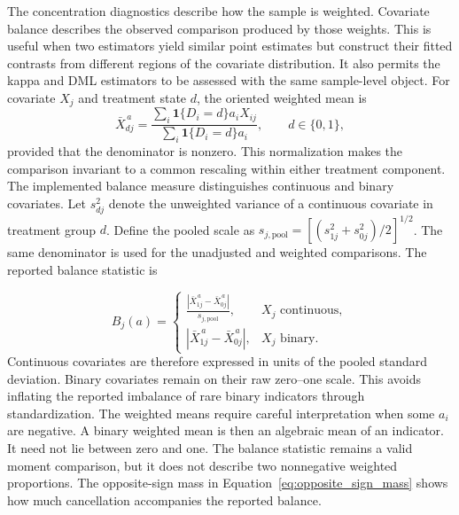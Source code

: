 \documentclass[12pt, a4paper, oneside]{article}
\theoremstyle{plain}
\theoremstyle{definition}
\begin{document}
The concentration diagnostics describe how the sample is weighted. Covariate balance
describes the observed comparison produced by those weights. This is useful when two
estimators yield similar point estimates but construct their fitted contrasts from
different regions of the covariate distribution. It also permits the kappa and DML
estimators to be assessed with the same sample-level object.
For covariate \(X_j\) and treatment state \(d\), the oriented weighted mean is
\begin{equation}
    \bar X^{\,a}_{dj}
    =
    \frac{\sum_i\mathbf 1\{D_i=d\}a_iX_{ij}}
         {\sum_i\mathbf 1\{D_i=d\}a_i},
         \qquad d\in\{0,1\},
    \label{eq:signed_weighted_mean}
\end{equation}
provided that the denominator is nonzero. This normalization makes the comparison
invariant to a common rescaling within either treatment component.
The implemented balance measure distinguishes continuous and binary covariates. Let
\(s_{dj}^2\) denote the unweighted variance of a continuous covariate in treatment
group \(d\). Define the pooled scale as
\(s_{j,\mathrm{pool}}=[(s_{1j}^2+s_{0j}^2)/2]^{1/2}\). The same denominator is used
for the unadjusted and weighted comparisons. The reported balance statistic is




\begin{equation}
    B_j(a)=
    \begin{cases}
      \displaystyle
      \frac{\left|\bar X^{\,a}_{1j}-\bar X^{\,a}_{0j}\right|}
           {s_{j,\mathrm{pool}}},
      & X_j \text{ continuous},\\[10pt]
      \left|\bar X^{\,a}_{1j}-\bar X^{\,a}_{0j}\right|,
      & X_j \text{ binary}.
    \end{cases}
    \label{eq:mixed_balance_measure}
\end{equation}
Continuous covariates are therefore expressed in units of the pooled standard
deviation. Binary covariates remain on their raw zero--one scale. This avoids inflating
the reported imbalance of rare binary indicators through standardization. 
The weighted means require careful interpretation when some \(a_i\) are negative. A
binary weighted mean is then an algebraic mean of an indicator. It need not lie between
zero and one. The balance statistic remains a valid moment comparison, but it does not
describe two nonnegative weighted proportions. The opposite-sign mass in
Equation~\eqref{eq:opposite_sign_mass} shows how much cancellation accompanies the
reported balance.
\end{document}

